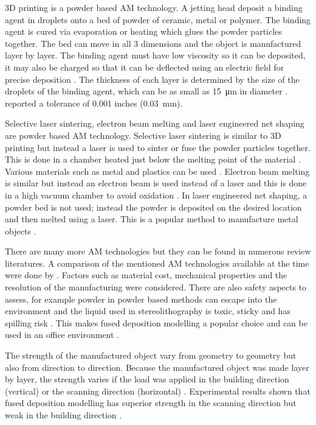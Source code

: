 3D printing is a powder based AM technology. A jetting head deposit a binding agent in droplets onto a bed of powder of ceramic, metal or polymer. The binding agent is cured via evaporation or heating which glues the powder particles together. The bed can move in all 3 dimensions and the object is manufactured layer by layer. The binding agent must have low viscosity so it can be deposited, it may also be charged so that it can be deflected using an electric field for precise deposition \citep{sachs1990three}. The thickness of each layer is determined by the size of the droplets of the binding agent, which can be as small as \SI{15}{\micro\metre} in diameter \citep{sachs1990three}. \cite{sachs1990three} reported a tolerance of 0.001 inches (\SI{0.03}{\milli\metre}).

Selective laser sintering, electron beam melting and laser engineered net shaping are powder based AM technology. Selective laser sintering is similar to 3D printing but instead a laser is used to sinter or fuse the powder particles together. This is done in a chamber heated just below the melting point of the material \citep{wong2012review}. Various materials such as metal and plastics can be used \citep{wong2012review}. Electron beam melting is similar but instead an electron beam is used instead of a laser and this is done in a high vacuum chamber to avoid oxidation \citep{wong2012review}. In laser engineered net shaping, a powder bed is not used; instead the powder is deposited on the desired location and then melted using a laser. This is a popular method to manufacture metal objects \citep{gibson2010additive}.

There are many more AM technologies but they can be found in numerous review literatures. A comparison of the mentioned AM technologies available at the time were done by \cite{pham1998comparison, kim2008benchmark}. Factors such as material cost, mechanical properties and the resolution of the manufacturing were considered. There are also safety aspects to assess, for example powder in powder based methods can escape into the environment and the liquid used in stereolithography is toxic, sticky and has spilling risk \citep{kim2008benchmark}. This makes fused deposition modelling a popular choice and can be used in an office environment \citep{ngo2018additive}.

The strength of the manufactured object vary from geometry to geometry but also from direction to direction. Because the manufactured object was made layer by layer, the strength varies if the load was applied in the building direction (vertical) or the scanning direction (horizontal) \citep{kim2008benchmark}. Experimental results shown that fused deposition modelling has superior strength in the scanning direction but weak in the building direction \citep{kim2008benchmark}.


